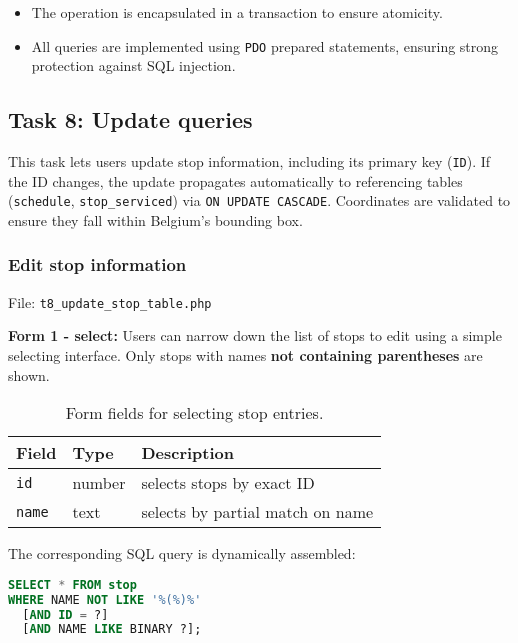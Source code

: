 \documentclass[a4paper, 12pt]{article}
\begin{document}
\begin{itemize}
    \item The operation is encapsulated in a transaction to ensure atomicity. 
    \item All queries are implemented using \texttt{PDO} prepared statements, ensuring strong protection against SQL injection.
\end{itemize}


% 
\subsection{Task 8: Update queries}

This task lets users update stop information, including its primary key (\texttt{ID}). If the ID changes, the update propagates automatically to referencing tables (\texttt{schedule}, \texttt{stop\_serviced}) via \texttt{ON UPDATE CASCADE}. Coordinates are validated to ensure they fall within Belgium’s bounding box.


\subsubsection{Edit stop information}

File: \texttt{t8\_update\_stop\_table.php}

\textbf{Form 1 - select:}  
Users can narrow down the list of stops to edit using a simple selecting interface. Only stops with names \textbf{not containing parentheses} are shown.

\begin{table}[H]
    \centering
    \footnotesize
    \caption{Form fields for selecting stop entries.}
    \label{tab:p3-t8-select-form}
    \begin{tabular}{lll}
        \toprule
        \textbf{Field} & \textbf{Type} & \textbf{Description} \\
        \midrule
        \texttt{id} & number & selects stops by exact ID \\
        \texttt{name} & text & selects by partial match on name \\
        \bottomrule
    \end{tabular}
\end{table}

The corresponding SQL query is dynamically assembled:
\begin{lstlisting}[language=SQL]
SELECT * FROM stop
WHERE NAME NOT LIKE '%(%)%'
  [AND ID = ?]
  [AND NAME LIKE BINARY ?];
\end{lstlisting}
\end{document}

